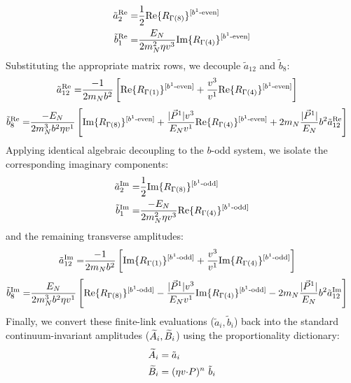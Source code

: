 \begin{align}
    \tilde a^{\text{Re}}_2 = & \frac{1}{2}\text{Re}\{ R_{\Gamma(8)}\}^{[b^{1}\text{-even}]} \\
    \tilde b^{\text{Re}}_1 = & \frac{E_{N}}{2m_N^2 \eta v^3} \text{Im}\{ R_{\Gamma(4)}\}^{[b^{1}\text{-even}]}
\end{align}
Substituting the appropriate matrix rows, we decouple $\tilde a_{12}$ and $\tilde b_8$:
\begin{align}
   \tilde a^{\text{Re}}_{12}=&\frac{-1}{2m_N  b^2}\left[\text{Re}\{ R_{\Gamma(1)}\}^{[b^{1}\text{-even}]}+\frac{v^3}{v^1}\text{Re}\{ R_{\Gamma(4)}\}^{[b^{1}\text{-even}]}\right]
\end{align}
\begin{align}
    \tilde b^{\text{Re}}_8=&\frac{-E_N}{ 2m_N^3 b^2 \eta v^1 }\left[\text{Im}\{ R_{\Gamma(8)}\}^{[b^{1}\text{-even}]}+\frac{|\vec{P}^1|v^3}{E_N v^1}\text{Re}\{ R_{\Gamma(4)}\}^{[b^{1}\text{-even}]}+ 2m_N  \frac{|\vec{P}^1|}{E_N} b^2  \tilde a^{\text{Re}}_{12}\right]
\end{align}
Applying identical algebraic decoupling to the $b$-odd system, we isolate the corresponding imaginary components:
\begin{align}
    \tilde a^{\text{Im}}_2 = & \frac{1}{2}\text{Im}\{ R_{\Gamma(8)}\}^{[b^{1}\text{-odd}]} \\
    \tilde b^{\text{Im}}_1 = & \frac{-E_{N}}{2m_N^2 \eta v^3} \text{Re}\{ R_{\Gamma(4)}\}^{[b^{1}\text{-odd}]}
\end{align}
and the remaining transverse amplitudes:
\begin{align}
   \tilde a^{\text{Im}}_{12}=&\frac{-1}{2m_N  b^2}\left[\text{Im}\{ R_{\Gamma(1)}\}^{[b^{1}\text{-odd}]}+\frac{v^3}{v^1}\text{Im}\{ R_{\Gamma(4)}\}^{[b^{1}\text{-odd}]}\right]
\end{align}
\begin{align}
    \tilde b^{\text{Im}}_8=&\frac{E_N}{ 2m_N^3 b^2 \eta v^1 }\left[\text{Re}\{ R_{\Gamma(8)}\}^{[b^{1}\text{-odd}]}-\frac{|\vec{P}^1|v^3}{E_N v^1}\text{Im}\{ R_{\Gamma(4)}\}^{[b^{1}\text{-odd}]}- 2m_N  \frac{|\vec{P}^1|}{E_N} b^2  \tilde a^{\text{Im}}_{12}\right]
\end{align}
Finally, we convert these finite-link evaluations ($\tilde a_i, \tilde b_i$) back into the standard continuum-invariant amplitudes ($\widetilde{A}_i, \widetilde{B}_i$) using the proportionality dictionary:
\begin{align}
	\widetilde{A}_i & = \tilde a_i \\
	 \widetilde{B}_i & = (\eta v {\cdot} P)^n\ \tilde b_i
\end{align}

